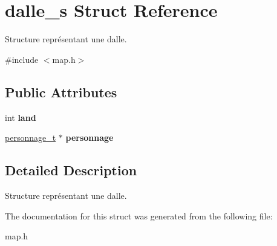 \hypertarget{structdalle__s}{}\section{dalle\+\_\+s Struct Reference}
\label{structdalle__s}


Structure représentant une dalle.  




{\ttfamily \#include $<$map.\+h$>$}

\subsection*{Public Attributes}
\begin{DoxyCompactItemize}
\item 
\mbox{\label{structdalle__s_ac8d9f122d7f8759c62ceef1e3c8fbb45}} 
int {\bfseries land}
\item 
\mbox{\label{structdalle__s_a7bea502c234bada29f06ecc5e27c9f42}} 
\mbox{\hyperlink{structpersonnage__s}{personnage\+\_\+t}} $\ast$ {\bfseries personnage}
\end{DoxyCompactItemize}


\subsection{Detailed Description}
Structure représentant une dalle. 

The documentation for this struct was generated from the following file\+:\begin{DoxyCompactItemize}
\item 
map.\+h\end{DoxyCompactItemize}
